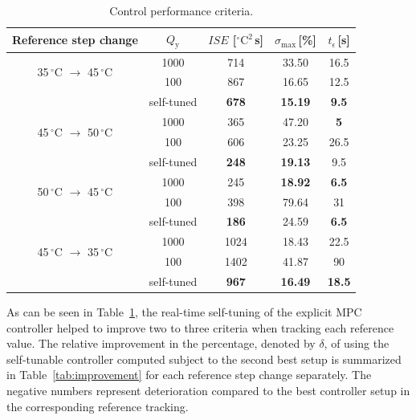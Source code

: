 \documentclass[preprint,12pt]{elsarticle}
\begin{document}
	\begin{table}[h!]
		\begin{center}
			\caption{Control performance criteria.}
			\label{tab:control_performance}
			\begin{tabular}{c|c|c|c|c} 
				Reference step change & $Q_\mathrm{y}$ & $ISE$ [$^{\circ}\mathrm{C}^2$\,s] & $\sigma_{\mathrm{max}}$\,[\%] & $t_{\epsilon}$\,[s]  \\
				\hline
				\multirow{2}{*}{ 35\,$^{\circ}$C $\rightarrow$ 45\,$^{\circ}$C } & 1000 & 714 & 33.50 & 16.5 \\
				& 100 & 867 & 16.65 & 12.5 \\ 
				& self-tuned & \textbf{678} & \textbf{15.19} & \textbf{9.5}  \\ 
				\hline
				\multirow{2}{*}{ 45\,$^{\circ}$C $\rightarrow$ 50\,$^{\circ}$C } & 1000 & 365 & 47.20 & \textbf{5} \\
				& 100 & 606 & 23.25 & 26.5  \\ 
				& self-tuned & \textbf{248} & \textbf{19.13} & 9.5  \\ 
				\hline
				\multirow{2}{*}{ 50\,$^{\circ}$C $\rightarrow$ 45\,$^{\circ}$C } & 1000 & 245 & \textbf{18.92} & \textbf{6.5}  \\
				& 100 & 398 & 79.64 & 31  \\ 
				& self-tuned & \textbf{186} & 24.59 & \textbf{6.5}  \\ 
				\hline
				\multirow{2}{*}{ 45\,$^{\circ}$C $\rightarrow$ 35\,$^{\circ}$C } & 1000 & 1024 & 18.43 & 22.5  \\
				& 100 & 1402 & 41.87 & 90  \\ 
				& self-tuned & \textbf{967} & \textbf{16.49} & \textbf{18.5}   
			\end{tabular}
		\end{center}
	\end{table}
	
	As can be seen in Table~\ref{tab:control_performance}, the real-time self-tuning of the explicit MPC controller helped to improve two to three criteria when tracking each reference value. 	
	The relative improvement in the percentage, denoted by $\delta$, of using the self-tunable controller computed subject to the second best setup is summarized in Table~\ref{tab:improvement} for each reference step change separately. The negative numbers represent deterioration compared to the best controller setup in the corresponding reference tracking. 
	
\end{document}
